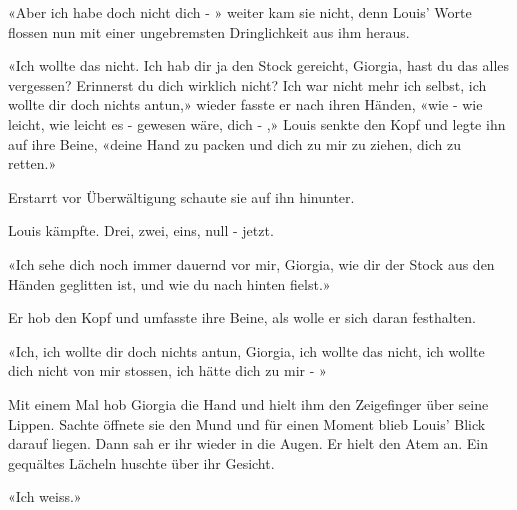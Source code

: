 «Aber ich habe doch nicht dich - » weiter kam sie nicht, denn Louis’
Worte flossen nun mit einer ungebremsten Dringlichkeit aus ihm heraus. 

«Ich wollte das nicht. Ich hab dir ja den Stock gereicht, Giorgia, hast
du das alles vergessen? Erinnerst du dich wirklich nicht? Ich war nicht
mehr ich selbst, ich wollte dir doch nichts antun,» wieder fasste er nach ihren Händen, «wie - wie leicht, wie leicht es - gewesen wäre, dich - ,» Louis senkte den Kopf und legte ihn auf
ihre Beine, «deine Hand zu packen und dich zu mir zu ziehen, dich zu
retten.»

Erstarrt vor Überwältigung schaute sie auf ihn hinunter. 

Louis kämpfte. Drei, zwei, eins, null - jetzt. 

«Ich sehe dich noch immer dauernd vor mir, Giorgia, wie dir der Stock
aus den Händen geglitten ist, und wie du nach hinten fielst.»

Er hob den Kopf und umfasste ihre Beine, als wolle er sich daran
festhalten. 

«Ich, ich wollte dir doch nichts antun, Giorgia, ich wollte das nicht, 
ich wollte dich nicht von mir stossen, ich hätte dich zu mir - »

Mit einem Mal hob Giorgia die Hand und hielt ihm den Zeigefinger über seine Lippen. 
Sachte öffnete sie den Mund und für einen Moment blieb Louis’ Blick darauf liegen. Dann sah er ihr wieder in die Augen. Er hielt den Atem an. 
Ein gequältes Lächeln huschte über ihr Gesicht.

«Ich weiss.»
